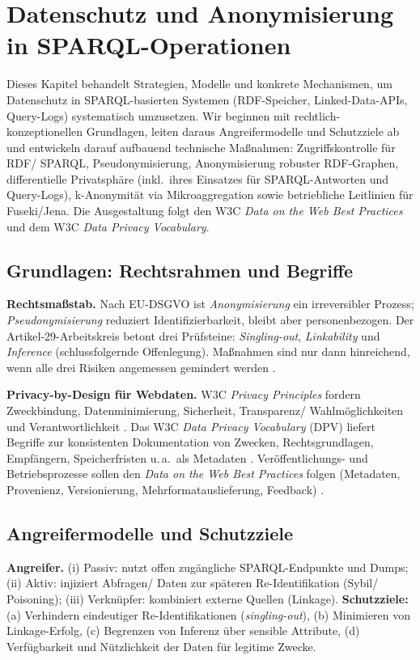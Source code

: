 \section{Datenschutz und Anonymisierung in SPARQL-Operationen}
\label{sec:privacy}

Dieses Kapitel behandelt Strategien, Modelle und konkrete Mechanismen, um Datenschutz in SPARQL-basierten Systemen (RDF-Speicher, Linked-Data-APIs, Query-Logs) systematisch umzusetzen. Wir beginnen mit rechtlich-konzeptionellen Grundlagen, leiten daraus Angreifermodelle und Schutzziele ab und entwickeln darauf aufbauend technische Maßnahmen: Zugriffskontrolle für RDF/ SPARQL, Pseudonymisierung, Anonymisierung robuster RDF-Graphen, differentielle Privatsphäre (inkl.\ ihres Einsatzes für SPARQL-Antworten und Query-Logs), k-Anonymität via Mikroaggregation sowie betriebliche Leitlinien für Fuseki/Jena. Die Ausgestaltung folgt den W3C \emph{Data on the Web Best Practices} und dem W3C \emph{Data Privacy Vocabulary}.

\subsection{Grundlagen: Rechtsrahmen und Begriffe}
\textbf{Rechtsmaßstab.} Nach EU-DSGVO ist \emph{Anonymisierung} ein irreversibler Prozess; \emph{Pseudonymisierung} reduziert Identifizierbarkeit, bleibt aber personenbezogen. Der Artikel-29-Arbeitskreis betont drei Prüfsteine: \emph{Singling-out}, \emph{Linkability} und \emph{Inference} (schlussfolgernde Offenlegung). Maßnahmen sind nur dann hinreichend, wenn alle drei Risiken angemessen gemindert werden \cite{Art29WPAnonymisation, enisa2019pseudonymisation}.

\textbf{Privacy-by-Design für Webdaten.} W3C \emph{Privacy Principles} fordern Zweckbindung, Datenminimierung, Sicherheit, Transparenz/ Wahlmöglichkeiten und Verantwortlichkeit \cite{W3CPrivacyPrinciples}. Das W3C \emph{Data Privacy Vocabulary} (DPV) liefert Begriffe zur konsistenten Dokumentation von Zwecken, Rechtsgrundlagen, Empfängern, Speicherfristen u.\,a.\ als Metadaten \cite{W3CDPV}. Veröffentlichungs- und Betriebsprozesse sollen den \emph{Data on the Web Best Practices} folgen (Metadaten, Provenienz, Versionierung, Mehrformatauslieferung, Feedback) \cite{W3CDWBP}.

\subsection{Angreifermodelle und Schutzziele}
\textbf{Angreifer.} (i) Passiv: nutzt offen zugängliche SPARQL-Endpunkte und Dumps; (ii) Aktiv: injiziert Abfragen/ Daten zur späteren Re-Identifikation (Sybil/ Poisoning); (iii) Verknüpfer: kombiniert externe Quellen (Linkage). \textbf{Schutzziele:} (a) Verhindern eindeutiger Re-Identifikationen (\emph{singling-out}), (b) Minimieren von Linkage-Erfolg, (c) Begrenzen von Inferenz über sensible Attribute, (d) Verfügbarkeit und Nützlichkeit der Daten für legitime Zwecke.

